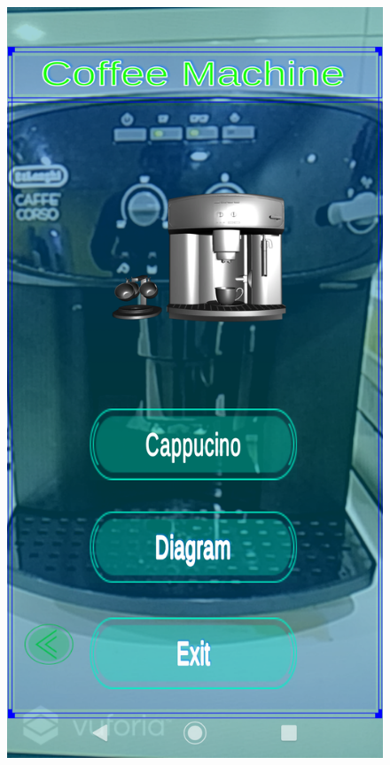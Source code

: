 \documentclass{aifyp}
\begin{document}
\begin{appendices}
\begin{figure}[H]
\begin{minipage}{.5\textwidth}
          \label{fig:MapSideView}
        \end{minipage}
\end{figure}
\begin{figure}[H]
    \centering
        \begin{minipage}{.5\textwidth}
          \centering
          \includegraphics[scale=0.2]{Images/Chapter5/Impl7.png}

\end{minipage}
\end{figure}
\end{appendices}
\end{document}
